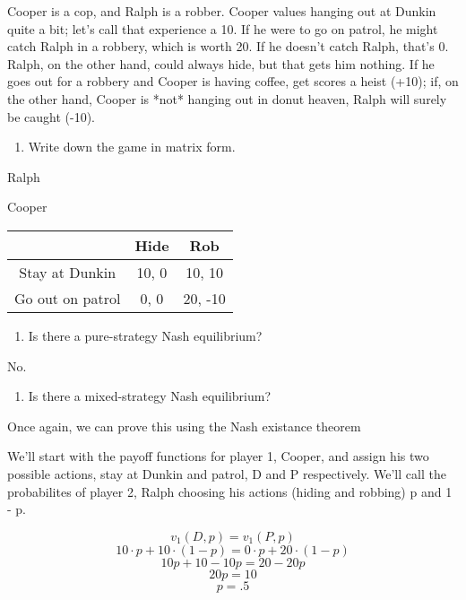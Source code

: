 \documentclass{article}
\begin{document}
\begin{enumerate}
          Cooper is a cop, and Ralph is a robber. Cooper values hanging out at Dunkin quite a bit; let's call that experience a 10. If he were to go on patrol, he might catch Ralph in a robbery, which is worth 20. If he doesn't catch Ralph, that's 0. Ralph, on the other hand, could always hide, but that gets him nothing. If he goes out for a robbery and Cooper is having coffee, get scores a heist (+10); if, on the other hand, Cooper is *not* hanging out in donut heaven, Ralph will surely be caught (-10).

          \begin{enumerate}[label=(\alph*)]
              \item Write down the game in matrix form.
          \end{enumerate}

          \centerline{Ralph}
          \begin{center}
              Cooper
              \begin{tabular}{|c|c|c|}
                  \hline
                                   & Hide  & Rob     \\ \hline
                  Stay at Dunkin   & 10, 0 & 10, 10  \\ \hline
                  Go out on patrol & 0, 0  & 20, -10 \\ \hline
              \end{tabular}
          \end{center}

          \begin{enumerate}[resume]
              \item Is there a pure-strategy Nash equilibrium?
          \end{enumerate}

          No.

          \begin{enumerate}[resume]
              \item Is there a mixed-strategy Nash equilibrium?
          \end{enumerate}

          Once again, we can prove this using the Nash existance theorem

          We'll start with the payoff functions for player 1, Cooper, and assign his two possible actions, stay at Dunkin and patrol, D and P respectively. We'll call the probabilites of player 2, Ralph choosing his actions (hiding and robbing) p and 1 - p.

          \[v_1(D, p) = v_1(P, p)\]
          \[10 \cdot p + 10 \cdot (1 - p) = 0 \cdot p + 20 \cdot (1 - p)\]
          \[10p + 10 - 10p = 20 - 20p\]
          \[20p = 10\]
          \[p = .5\]


\end{enumerate}
\end{document}
